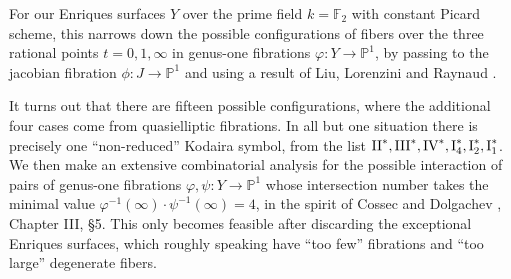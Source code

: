 \documentclass[oneside, 12pt]{amsart}
\theoremstyle{definition}
\theoremstyle{remark}
\newcommand{\FF}{\mathbb{F}}
\newcommand{\PP}{\mathbb{P}}
\newcommand{\I}{\text{\rm I}}
\newcommand{\II}{\text{\rm II}}
\newcommand{\III}{\text{\rm III}}
\newcommand{\IV}{\text{\rm IV}}
\newcommand{\ra}{\rightarrow}
\newcommand{\inv}{{-1}}
\begin{document}
For our Enriques surfaces $Y$ over the prime field $k=\FF_2$ with constant Picard scheme,
this narrows down the possible configurations of fibers over the three rational points $t=0,1,\infty$
in genus-one fibrations $\varphi:Y\ra\PP^1$, by passing to the jacobian fibration $\phi:J\ra\PP^1$ and using 
a result of Liu, Lorenzini and Raynaud \cite{Liu; Lorenzini; Raynaud 2005}.

It turns out that there are fifteen possible configurations, 
where the  additional four cases come from quasielliptic fibrations. In all but one situation there is precisely one ``non-reduced''
Kodaira symbol, from the list $\II^*,\III^*,\IV^*,\I^*_4, \I_2^*, \I_1^*$.
We then make an extensive combinatorial analysis for the possible interaction of pairs of genus-one fibrations
$\varphi,\psi:Y\ra\PP^1$ whose intersection number takes the minimal value  $\varphi^\inv(\infty)\cdot\psi^\inv(\infty)=4$,
in the spirit of Cossec and Dolgachev \cite{Cossec; Dolgachev 1989}, Chapter III, \S 5.
This only becomes feasible after  discarding the   exceptional Enriques surfaces,
which roughly speaking have ``too few'' fibrations and ``too large'' degenerate fibers.
\end{document}
